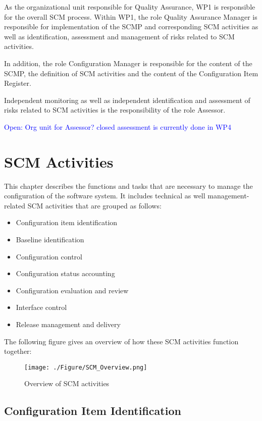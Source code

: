\documentclass{template/openetcs_report}
\begin{document}
As the organizational unit responsible for Quality Assurance, WP1 is responsible for the overall SCM process. Within WP1, the role Quality Assurance Manager is responsible for implementation of the SCMP and corresponding SCM activities as well as identification, assessment and management of risks related to SCM activities.

In addition, the role Configuration Manager is responsible for the content of the SCMP, the definition of SCM activities and the content of the Configuration Item Register.

Independent monitoring as well as independent identification and assessment of risks related to SCM activities is the responsibility of the role Assessor.

\textcolor{blue}{Open: Org unit for Assessor? closed assessment is currently done in WP4}

\newpage


\section{SCM Activities} %
\label{sec:SCM Activities}

This chapter describes the functions and tasks that are necessary to manage the configuration of the software system. It includes technical as well management-related SCM activities that are grouped as follows:

\vspace{-10pt}
\begin{itemize}
\item Configuration item identification
\item Baseline identification
\item Configuration control
\item Configuration status accounting
\item Configuration evaluation and review
\item Interface control
\item Release management and delivery
\end{itemize}

The following figure gives an overview of how these SCM activities function together:

\begin{figure}[H]
\centering
\caption{Overview of SCM activities}
\texttt{[image: ./Figure/SCM\_Overview.png]}
\end{figure}


\subsection{Configuration Item Identification} %
\label{sec:Configuration Item Identification}
\end{document}
